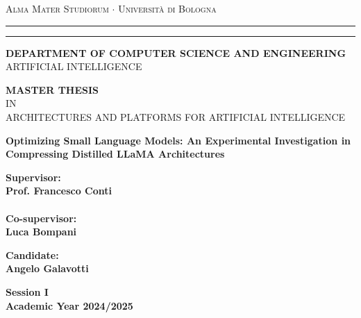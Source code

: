 \documentclass[12pt,a4paper,openright,twoside]{report}
\begin{document}
\begin{titlepage}
	\begin{center}
		{{\Large{\textsc{Alma Mater Studiorum $\cdot$ Università di
							Bologna}}}} \rule[0.1cm]{15.8cm}{0.1mm}
		\rule[0.5cm]{15.8cm}{0.6mm}
		{\small{{\bf DEPARTMENT OF COMPUTER SCIENCE
		AND ENGINEERING}\\}
		ARTIFICIAL INTELLIGENCE }
	\end{center}
	\vspace{5mm}
		\begin{center}

		{\small{{\bf MASTER THESIS}\\IN\\}
		ARCHITECTURES AND PLATFORMS FOR ARTIFICIAL INTELLIGENCE}
	\end{center}
	\vspace{15mm}
	\begin{center}
		{\LARGE{\bf Optimizing Small Language Models: An Experimental Investigation in Compressing Distilled LLaMA Architectures}}\\
		\vspace{3mm}
	\end{center}
	\vspace{40mm}
	\par
	\noindent
	\begin{minipage}[t]{0.47\textwidth}
		{\large{\bf Supervisor:\\
				Prof. Francesco Conti\\\\
				Co-supervisor:\\
				Luca Bompani}}
	\end{minipage}
	\hfill
	\begin{minipage}[t]{0.47\textwidth}\raggedleft
		{\large{\bf Candidate:\\
				Angelo Galavotti}}
	\end{minipage}
	\vspace{15mm}
	\begin{center}
		{\large{\bf Session I\\
				Academic Year 2024/2025}}
	\end{center}
\end{titlepage}
\end{document}
